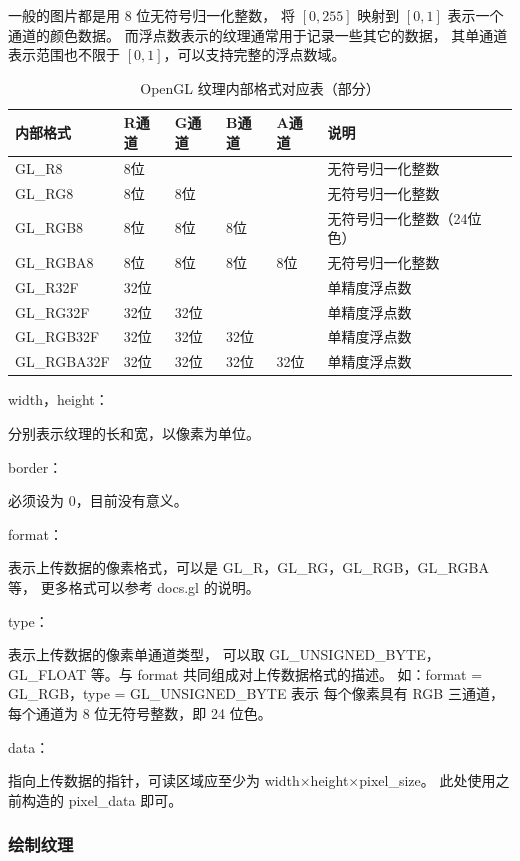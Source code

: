 \documentclass[fontset=windows]{ctexart}
\begin{document}
一般的图片都是用 8 位无符号归一化整数，
将 $[0, 255]$ 映射到 $[0, 1]$ 表示一个通道的颜色数据。
而浮点数表示的纹理通常用于记录一些其它的数据，
其单通道表示范围也不限于 $[0, 1]$，可以支持完整的浮点数域。

\begin{table}
\begin{tabular}{|l|l|l|l|l|l|l|}
    \hline
    内部格式&R通道&G通道&B通道&A通道&说明\\
    \hline
    GL\_R8&8位&&&&无符号归一化整数\\
    \hline
    GL\_RG8&8位&8位&&&无符号归一化整数\\
    \hline
    GL\_RGB8&8位&8位&8位&&无符号归一化整数（24位色）\\
    \hline
    GL\_RGBA8&8位&8位&8位&8位&无符号归一化整数\\
    \hline
    GL\_R32F&32位&&&&单精度浮点数\\
    \hline
    GL\_RG32F&32位&32位&&&单精度浮点数\\
    \hline
    GL\_RGB32F&32位&32位&32位&&单精度浮点数\\
    \hline
    GL\_RGBA32F&32位&32位&32位&32位&单精度浮点数\\
    \hline
\end{tabular}
\caption{OpenGL 纹理内部格式对应表（部分）}
\label{tab-gl:internal-format-list}
\end{table}

width，height：

分别表示纹理的长和宽，以像素为单位。

border：

必须设为 0，目前没有意义。

format：

表示上传数据的像素格式，可以是 GL\_R，GL\_RG，GL\_RGB，GL\_RGBA 等，
更多格式可以参考 docs.gl 的说明。

type：

表示上传数据的像素单通道类型，
可以取 GL\_UNSIGNED\_BYTE，
GL\_FLOAT 等。与 format 共同组成对上传数据格式的描述。
如：format = GL\_RGB，type = GL\_UNSIGNED\_BYTE 表示
每个像素具有 RGB 三通道，每个通道为 8 位无符号整数，即 24 位色。

data：

指向上传数据的指针，可读区域应至少为 width$\times$height$\times$pixel\_size。
此处使用之前构造的 pixel\_data 即可。

\subsubsection{绘制纹理}
\end{document}
